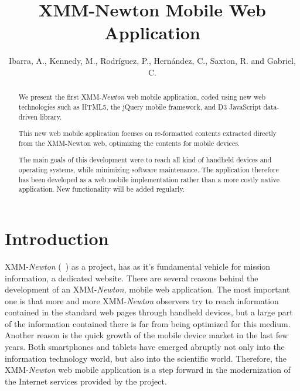 
\resetcounters




\title{XMM-Newton Mobile Web Application}
\author{Ibarra, A., Kennedy, M., Rodr\'iguez, P., Hern\'andez, C., Saxton, R. and Gabriel, C.}

\begin{abstract}
We present the first XMM-{\em Newton} web mobile application, coded using new web technologies such as HTML5, the jQuery mobile framework, and D3 JavaScript data-driven library.

This new web mobile application focuses on re-formatted contents extracted directly from the XMM-Newton web, optimizing the contents for mobile devices. 

The main goals of this development were to reach all kind of handheld devices and operating systems, while minimizing software maintenance. The application therefore has been developed as a web mobile implementation rather than a more costly native application. New functionality will be added regularly.

\end{abstract}

\section{Introduction}

XMM-{\em Newton} (~\cite{Jansen}) as a project, has as it's fundamental vehicle for mission information, a dedicated website. There are several reasons behind the development of an XMM-{\em Newton,} mobile web application. The most important one is that more and more XMM-{\em Newton} observers try to reach information contained in the standard web pages through handheld devices, but a large part of the information contained there is far from being optimized for this medium. Another reason is the quick growth of the mobile device market in the last few years.  Both smartphones and tablets have emerged abruptly not only into the information technology world, but also into the scientific world. Therefore, the XMM-{\em Newton} web mobile application is a step forward in the modernization of the Internet services provided by the project.
 

